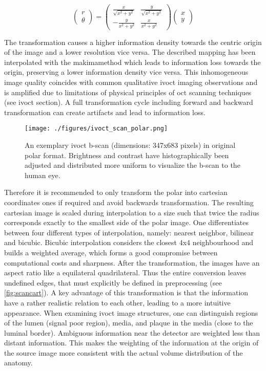 \begin{equation}
\begin{pmatrix}
r \\
\theta \end{pmatrix} = \begin{pmatrix}
\frac{x}{\sqrt{x^2 + y^2}} & \frac{y}{\sqrt{x^2 + y^2}} \\
-\frac{y}{x^2 + y^2} & \frac{x}{x^2 + y^2} \end{pmatrix} \begin{pmatrix} x \\ y \end{pmatrix}
\label{eq:polmatrix}
\end{equation}

The transformation causes a higher information density towards the centric origin of the image and a lower resolution vice versa. The described mapping has been interpolated with the \Gls{makimamethod} which leads to information loss towards the origin, preserving a lower information density vice versa. This inhomogeneous image quality coincides with common qualitative \acrshort{ivoct} imaging observations and is amplified due to limitations of physical principles of \acrshort{oct} scanning techniques (see \acrshort{ivoct} section). A full transformation cycle including forward and backward transformation can create artifacts and lead to information loss.
\begin{figure}[htb]
	\centering
	\texttt{[image: ./figures/ivoct\_scan\_polar.png]}
	\caption[\acrshort{ivoct} polar \Gls{b-scan}]{An exemplary \acrshort{ivoct} \Gls{b-scan} (dimensions: 347x683 pixels) in original polar format. Brightness and contrast have histographically been adjusted and distributed more uniform to visualize the \Gls{b-scan} to the human eye.}
	\label{fig:scanpol}
\end{figure}
Therefore it is recommended to only transform the polar into cartesian coordinates ones if required and avoid backwards transformation. The resulting cartesian image is scaled during \gls{interpolation} to a size such that twice the radius corresponds exactly to the smallest side of the polar image. One differentiates between four different types of \gls{interpolation}, namely: nearest neighbor, bilinear and bicubic. Bicubic \gls{interpolation} considers the closest 4x4 neighbourhood and builds a weighted average, which forms a good compromise between computational costs and sharpness. After the transformation, the images have an aspect ratio like a equilateral quadrilateral. Thus the entire conversion leaves undefined edges, that must explicitly be defined in preprocessing (see \cref{fig:scancart}). A key advantage of this transformation is that the information have a rather realistic relation to each other, leading to a more intuitive appearance. When examining \acrshort{ivoct} image structures, one can distinguish regions of the lumen (signal poor region), media, and plaque in the media (close to the luminal border). Ambiguous information near the detector are weighted less than distant information. This makes the weighting of the information at the origin of the source image more consistent with the actual volume distribution of the anatomy.
